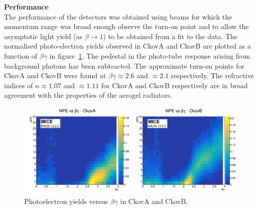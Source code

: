 \noindent\textbf{Performance} \\
\noindent
The performance of the detectors was obtained using beams for which
the momentum range was broad enough observe the turn-on point and to
allow the asymptotic light yield (as $\beta \rightarrow 1$) to be
obtained from a fit to the data.
The normalised photo-electron yields observed in CkovA and CkovB are
plotted as a function of $\beta\gamma$ in
figure~\ref{fig:ckov_betagamma}.
The pedestal in the photo-tube response arising from background
photons has been subtracted.
The approximate turn-on points for CkovA and CkovB were found at
$\beta\gamma \approx 2.6$ and $\approx 2.1$ respectively.
The refractive indices of $n \approx 1.07$ and $\approx 1.11$ for
CkovA and CkovB respectively are in broad agreement with the
properties of the aerogel radiators. 
\begin{figure}
  \begin{center}
    \includegraphics[width=0.90\columnwidth]{./03-Ckov/Figures/scatter_betagamma_logo.png}
    \caption{Photoelectron yields versus $\beta\gamma$ in CkovA and CkovB.}
    \label{fig:ckov_betagamma}
  \end{center}
\end{figure}
